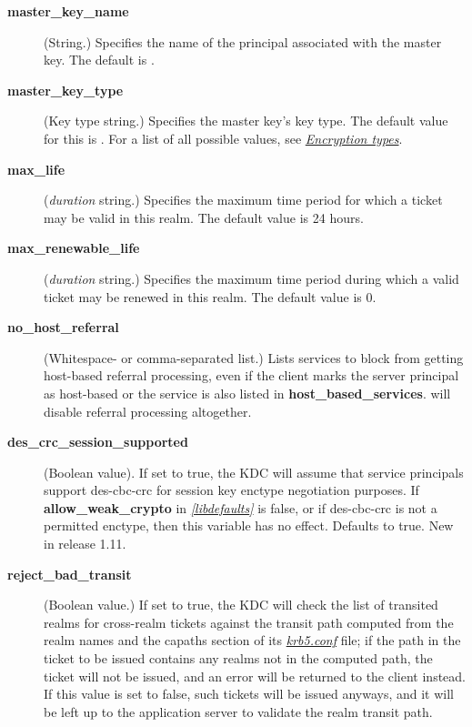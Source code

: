 \documentclass[letterpaper,10pt,english]{sphinxmanual}
\begin{document}
\begin{description}
\item[{\textbf{master\_key\_name}}] \leavevmode
(String.)  Specifies the name of the principal associated with the
master key.  The default is .

\item[{\textbf{master\_key\_type}}] \leavevmode
(Key type string.)  Specifies the master key's key type.  The
default value for this is .  For a list of all possible
values, see {\hyperref[admin/conf_files/kdc_conf:encryption-types]{\emph{Encryption types}}}.

\item[{\textbf{max\_life}}] \leavevmode
(\emph{duration} string.)  Specifies the maximum time period for
which a ticket may be valid in this realm.  The default value is
24 hours.

\item[{\textbf{max\_renewable\_life}}] \leavevmode
(\emph{duration} string.)  Specifies the maximum time period
during which a valid ticket may be renewed in this realm.
The default value is 0.

\item[{\textbf{no\_host\_referral}}] \leavevmode
(Whitespace- or comma-separated list.)  Lists services to block
from getting host-based referral processing, even if the client
marks the server principal as host-based or the service is also
listed in \textbf{host\_based\_services}.   will
disable referral processing altogether.

\item[{\textbf{des\_crc\_session\_supported}}] \leavevmode
(Boolean value).  If set to true, the KDC will assume that service
principals support des-cbc-crc for session key enctype negotiation
purposes.  If \textbf{allow\_weak\_crypto} in {\hyperref[admin/conf_files/krb5_conf:libdefaults]{\emph{{[}libdefaults{]}}}} is
false, or if des-cbc-crc is not a permitted enctype, then this
variable has no effect.  Defaults to true.  New in release 1.11.

\item[{\textbf{reject\_bad\_transit}}] \leavevmode
(Boolean value.)  If set to true, the KDC will check the list of
transited realms for cross-realm tickets against the transit path
computed from the realm names and the capaths section of its
{\hyperref[admin/conf_files/krb5_conf:krb5-conf-5]{\emph{krb5.conf}}} file; if the path in the ticket to be issued
contains any realms not in the computed path, the ticket will not
be issued, and an error will be returned to the client instead.
If this value is set to false, such tickets will be issued
anyways, and it will be left up to the application server to
validate the realm transit path.


\end{description}
\end{document}
